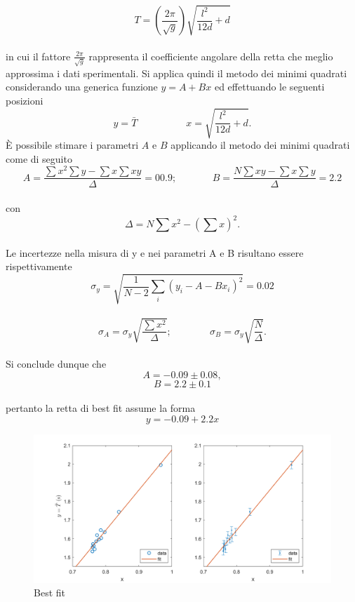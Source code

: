 \documentclass[11pt,a4paper]{article}
\begin{document}
\begin{equation}
    T = \left ( \frac{2 \pi}{\sqrt{g}} \right ) \sqrt{\frac{l^2}{12d}+d}
\end{equation}
\\
in cui il fattore $\frac{2 \pi}{\sqrt{g}}$ rappresenta il coefficiente angolare della retta che meglio approssima i dati sperimentali. Si applica quindi il metodo dei minimi quadrati considerando una generica funzione $y = A + Bx$ ed effettuando le seguenti posizioni
\begin{equation}
    y = \bar{T} \; \; \; \; \; \; \; \; \; \; \; \; \; \; \; \; \; \; x = \sqrt{\frac{l^2}{12d}+d}.
\end{equation}
È possibile stimare i parametri $A$ e $B$ applicando il metodo dei minimi quadrati come di seguito
\begin{equation}
    A = \frac{\sum x^2 \sum y - \sum x \sum xy}{\Delta} = 00.9; \; \;  \; \; \; \;\; \; \; \; \; \; \; B = \frac{N\sum xy - \sum x \sum y}{\Delta} = 2.2
\end{equation}
\\
con
\begin{equation}
    \Delta = N \sum x^2 - \left( \sum x \right )^2.
\end{equation}
\\
Le incertezze nella misura di y e nei parametri A e B risultano essere rispettivamente
\begin{equation}
    \sigma_y = \sqrt{\frac{1}{N-2} \sum_i (y_i - A - Bx_i)^2} = 0.02
\end{equation}
\\
\begin{equation}
    \sigma_A = \sigma_y \sqrt{\frac{\sum x^2}{\Delta}}; \; \; \; \; \; \; \; \; \; \; \; \; \; \; \sigma_B = \sigma_y \sqrt{\frac{N}{\Delta}}.
\end{equation}
\\
Si conclude dunque che
\begin{equation}
    A = -0.09 \pm 0.08,
\end{equation}
\begin{equation}
   B = 2.2 \pm 0.1
\end{equation}
\\
pertanto la retta di best fit assume la forma
\begin{equation}
    y = -0.09 + 2.2x
\end{equation}
\begin{figure}[H]
    \centering
    \includegraphics[scale = .7]{img/plot4.png}
    \caption{Best fit}
    \label{fig:bestfit}
\end{figure}
\end{document}

